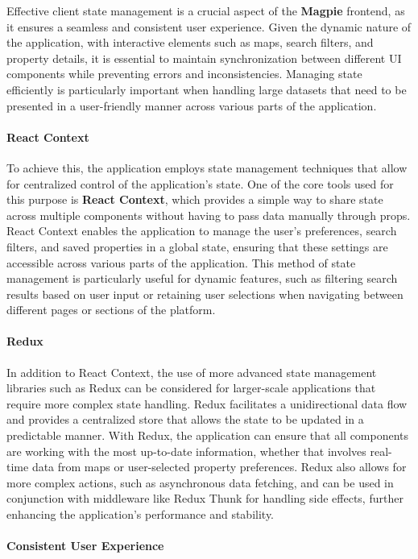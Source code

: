 Effective client state management is a crucial aspect of the \textbf{Magpie}
frontend, as it ensures a seamless and consistent user experience. Given the
dynamic nature of the application, with interactive elements such as maps,
search filters, and property details, it is essential to maintain
synchronization between different UI components while preventing errors and
inconsistencies. Managing state efficiently is particularly important when
handling large datasets that need to be presented in a user{-}friendly
manner across various parts of the application. \paragraph{React
Context}\mbox{}

To achieve this, the application employs state management techniques that
allow for centralized control of the application's state. One of the core
tools used for this purpose is \textbf{React Context}, which provides a
simple way to share state across multiple components without having to pass
data manually through props. React Context enables the application to manage
the user's preferences, search filters, and saved properties in a global
state, ensuring that these settings are accessible across various parts of
the application. This method of state management is particularly useful for
dynamic features, such as filtering search results based on user input or
retaining user selections when navigating between different pages or
sections of the platform. \paragraph{Redux}\mbox{}

In addition to React Context, the use of more advanced state management
libraries such as Redux can be considered for larger{-}scale applications
that require more complex state handling. Redux facilitates a unidirectional
data flow and provides a centralized store that allows the state to be
updated in a predictable manner. With Redux, the application can ensure that
all components are working with the most up{-}to{-}date information, whether
that involves real{-}time data from maps or user{-}selected property
preferences. Redux also allows for more complex actions, such as
asynchronous data fetching, and can be used in conjunction with middleware
like Redux Thunk for handling side effects, further enhancing the
application's performance and stability. \paragraph{Consistent User
Experience}\mbox{}

